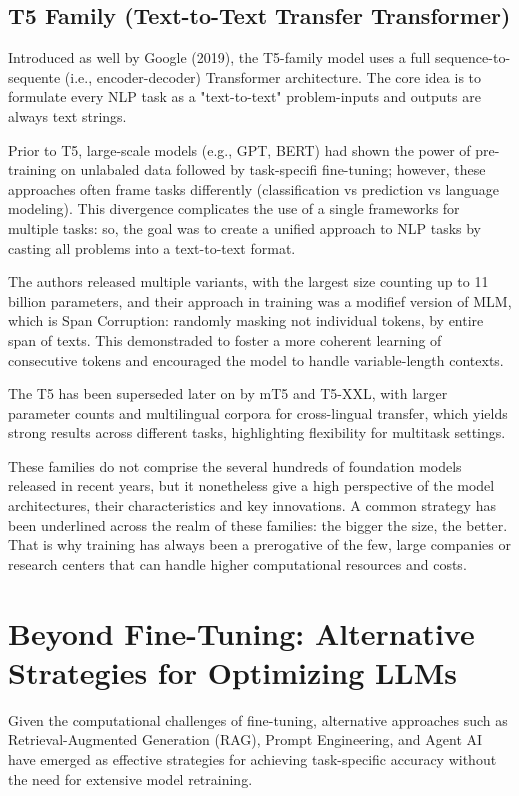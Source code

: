 \subsection{T5 Family (Text-to-Text Transfer Transformer)}

Introduced as well by Google (2019), the T5-family model uses a full sequence-to-sequente (i.e., encoder-decoder) Transformer architecture. The core idea is to formulate every NLP task as a "text-to-text" problem-inputs and outputs are always text strings.

Prior to T5, large-scale models (e.g., GPT, BERT) had shown the power of pre-training on unlabaled data followed by task-specifi fine-tuning; however, these approaches often frame tasks differently (classification vs prediction vs language modeling). This divergence complicates the use of a single frameworks for multiple tasks: so, the goal was to create a unified approach to NLP tasks by casting all problems into a text-to-text format.

The authors released multiple variants, with the largest size counting up to 11 billion parameters, and their approach in training was a modifief version of MLM, which is Span Corruption: randomly masking not individual tokens, by entire span of texts. This demonstraded to foster a more coherent learning of consecutive tokens and encouraged the model to handle variable-length contexts.

The T5 has been superseded later on by mT5 and T5-XXL, with larger parameter counts and multilingual corpora for cross-lingual transfer, which yields strong results across different tasks, highlighting flexibility for multitask settings.

These families do not comprise the several hundreds of foundation models released in recent years, but it nonetheless give a high perspective of the model architectures, their characteristics and key innovations. A common strategy has been underlined across the realm of these families: the bigger the size, the better. That is why training has always been a prerogative of the few, large companies or research centers that can handle higher computational resources and costs.


\section{Beyond Fine-Tuning: Alternative Strategies for Optimizing LLMs}

Given the computational challenges of fine-tuning, alternative approaches such as Retrieval-Augmented Generation (RAG), Prompt Engineering, and Agent AI have emerged as effective strategies for achieving task-specific accuracy without the need for extensive model retraining.

